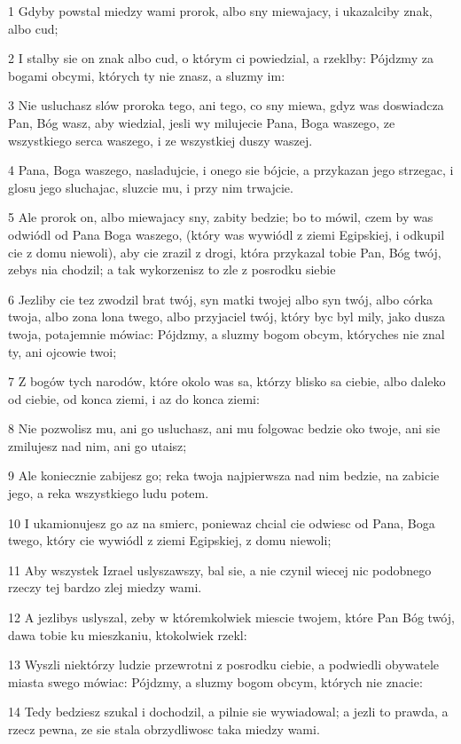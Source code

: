 \par 1 Gdyby powstal miedzy wami prorok, albo sny miewajacy, i ukazalciby znak, albo cud;
\par 2 I stalby sie on znak albo cud, o którym ci powiedzial, a rzeklby: Pójdzmy za bogami obcymi, których ty nie znasz, a sluzmy im:
\par 3 Nie usluchasz slów proroka tego, ani tego, co sny miewa, gdyz was doswiadcza Pan, Bóg wasz, aby wiedzial, jesli wy milujecie Pana, Boga waszego, ze wszystkiego serca waszego, i ze wszystkiej duszy waszej.
\par 4 Pana, Boga waszego, nasladujcie, i onego sie bójcie, a przykazan jego strzegac, i glosu jego sluchajac, sluzcie mu, i przy nim trwajcie.
\par 5 Ale prorok on, albo miewajacy sny, zabity bedzie; bo to mówil, czem by was odwiódl od Pana Boga waszego, (który was wywiódl z ziemi Egipskiej, i odkupil cie z domu niewoli), aby cie zrazil z drogi, która przykazal tobie Pan, Bóg twój, zebys nia chodzil; a tak wykorzenisz to zle z posrodku siebie
\par 6 Jezliby cie tez zwodzil brat twój, syn matki twojej albo syn twój, albo córka twoja, albo zona lona twego, albo przyjaciel twój, który byc byl mily, jako dusza twoja, potajemnie mówiac: Pójdzmy, a sluzmy bogom obcym, któryches nie znal ty, ani ojcowie twoi;
\par 7 Z bogów tych narodów, które okolo was sa, którzy blisko sa ciebie, albo daleko od ciebie, od konca ziemi, i az do konca ziemi:
\par 8 Nie pozwolisz mu, ani go usluchasz, ani mu folgowac bedzie oko twoje, ani sie zmilujesz nad nim, ani go utaisz;
\par 9 Ale koniecznie zabijesz go; reka twoja najpierwsza nad nim bedzie, na zabicie jego, a reka wszystkiego ludu potem.
\par 10 I ukamionujesz go az na smierc, poniewaz chcial cie odwiesc od Pana, Boga twego, który cie wywiódl z ziemi Egipskiej, z domu niewoli;
\par 11 Aby wszystek Izrael uslyszawszy, bal sie, a nie czynil wiecej nic podobnego rzeczy tej bardzo zlej miedzy wami.
\par 12 A jezlibys uslyszal, zeby w któremkolwiek miescie twojem, które Pan Bóg twój, dawa tobie ku mieszkaniu, ktokolwiek rzekl:
\par 13 Wyszli niektórzy ludzie przewrotni z posrodku ciebie, a podwiedli obywatele miasta swego mówiac: Pójdzmy, a sluzmy bogom obcym, których nie znacie:
\par 14 Tedy bedziesz szukal i dochodzil, a pilnie sie wywiadowal; a jezli to prawda, a rzecz pewna, ze sie stala obrzydliwosc taka miedzy wami.
